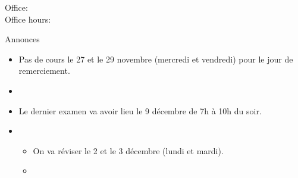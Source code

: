 \documentclass{beamer}
\subtitle[\lexi{En} et passé composé]{Le pronom \lexi{en} et plus de passé composé}
\begin{document}
  \begin{frame}
    \titlepage
    \tiny{Office: \\
          Office hours: }
  \end{frame}

  \begin{frame}{Annonces }
    \begin{itemize}
      \item Pas de cours le 27 et le 29 novembre (mercredi et vendredi) pour le jour de remerciement.
      \item[] 
      \item Le dernier examen va avoir lieu le 9 décembre de 7h à 10h \alert{du soir}.
      \item[] 
      \begin{itemize}
        \item On va réviser le 2 et le 3 décembre (lundi et \alert{mardi}).
        \item[] 
      \end{itemize}
    \end{itemize}
  \end{frame}

\end{document}
